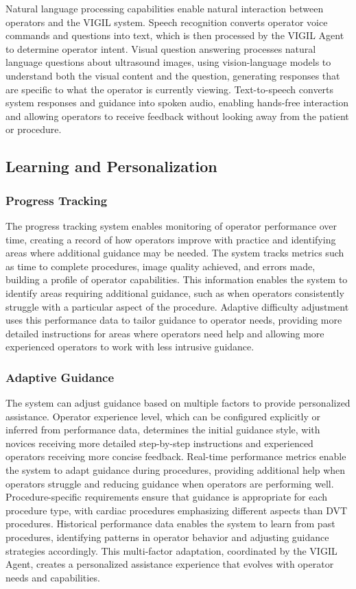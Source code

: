 \documentclass[12pt,a4paper]{article}
\begin{document}
Natural language processing capabilities enable natural interaction between operators and the VIGIL system. Speech recognition converts operator voice commands and questions into text, which is then processed by the VIGIL Agent to determine operator intent. Visual question answering processes natural language questions about ultrasound images, using vision-language models to understand both the visual content and the question, generating responses that are specific to what the operator is currently viewing. Text-to-speech converts system responses and guidance into spoken audio, enabling hands-free interaction and allowing operators to receive feedback without looking away from the patient or procedure.

\subsection{Learning and Personalization}

\subsubsection{Progress Tracking}

The progress tracking system enables monitoring of operator performance over time, creating a record of how operators improve with practice and identifying areas where additional guidance may be needed. The system tracks metrics such as time to complete procedures, image quality achieved, and errors made, building a profile of operator capabilities. This information enables the system to identify areas requiring additional guidance, such as when operators consistently struggle with a particular aspect of the procedure. Adaptive difficulty adjustment uses this performance data to tailor guidance to operator needs, providing more detailed instructions for areas where operators need help and allowing more experienced operators to work with less intrusive guidance.

\subsubsection{Adaptive Guidance}

The system can adjust guidance based on multiple factors to provide personalized assistance. Operator experience level, which can be configured explicitly or inferred from performance data, determines the initial guidance style, with novices receiving more detailed step-by-step instructions and experienced operators receiving more concise feedback. Real-time performance metrics enable the system to adapt guidance during procedures, providing additional help when operators struggle and reducing guidance when operators are performing well. Procedure-specific requirements ensure that guidance is appropriate for each procedure type, with cardiac procedures emphasizing different aspects than DVT procedures. Historical performance data enables the system to learn from past procedures, identifying patterns in operator behavior and adjusting guidance strategies accordingly. This multi-factor adaptation, coordinated by the VIGIL Agent, creates a personalized assistance experience that evolves with operator needs and capabilities.
\end{document}
